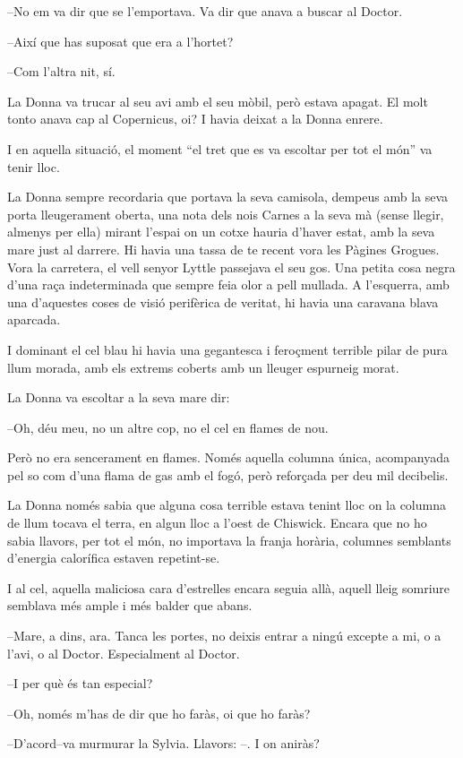 --No em va dir que se l'emportava. Va dir que anava a buscar al Doctor.

--Així que has suposat que era a l'hortet?

--Com l'altra nit, sí.

La Donna va trucar al seu avi amb el seu mòbil, però estava apagat. El
molt tonto anava cap al Copernicus, oi? I havia deixat a la Donna
enrere.

I en aquella situació, el moment ``el tret que es va escoltar per tot el
món'' va tenir lloc.

La Donna sempre recordaria que portava la seva camisola, dempeus amb la
seva porta lleugerament oberta, una nota dels nois Carnes a la seva mà
(sense llegir, almenys per ella) mirant l'espai on un cotxe hauria
d'haver estat, amb la seva mare just al darrere. Hi havia una tassa de
te recent vora les Pàgines Grogues. Vora la carretera, el vell senyor
Lyttle passejava el seu gos. Una petita cosa negra d'una raça
indeterminada que sempre feia olor a pell mullada. A l'esquerra, amb una
d'aquestes coses de visió perifèrica de veritat, hi havia una caravana
blava aparcada.

I dominant el cel blau hi havia una gegantesca i feroçment terrible
pilar de pura llum morada, amb els extrems coberts amb un lleuger
espurneig morat.

La Donna va escoltar a la seva mare dir:

--Oh, déu meu, no un altre cop, no el cel en flames de nou.

Però no era sencerament en flames. Només aquella columna única,
acompanyada pel so com d'una flama de gas amb el fogó, però reforçada
per deu mil decibelis.

La Donna només sabia que alguna cosa terrible estava tenint lloc on la
columna de llum tocava el terra, en algun lloc a l'oest de Chiswick.
Encara que no ho sabia llavors, per tot el món, no importava la franja
horària, columnes semblants d'energia calorífica estaven repetint-se.

I al cel, aquella maliciosa cara d'estrelles encara seguia allà, aquell
lleig somriure semblava més ample i més balder que abans.

--Mare, a dins, ara. Tanca les portes, no deixis entrar a ningú excepte
a mi, o a l'avi, o al Doctor. Especialment al Doctor.

--I per què és tan especial?

--Oh, només m'has de dir que ho faràs, oi que ho faràs?

--D'acord--va murmurar la Sylvia. Llavors: --. I on aniràs?

